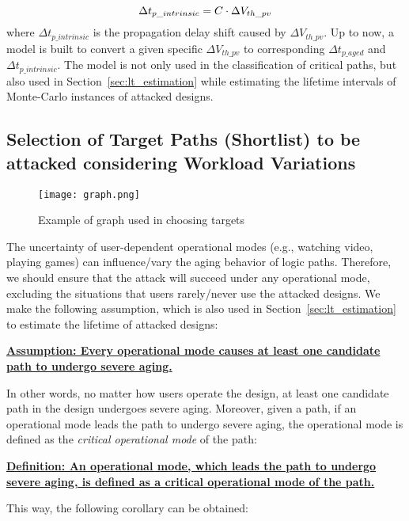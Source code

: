 \begin{equation}
	\centering
	\fontsize{9}{9} \selectfont
	\Delta t_{p\_intrinsic} = C \cdot \Delta V_{th\_pv}
	\label{eq:vtodelay2}
\end{equation}	
where $\Delta t_{p\_intrinsic}$ is the propagation delay shift caused by $\Delta V_{th\_pv}$. Up to now, a model is built to convert a given specific $\Delta V_{th\_pv}$ to corresponding $\Delta t_{p\_aged}$ and $\Delta t_{p\_intrinsic}$. The model is not only used in the classification of critical paths, but also used in Section~\ref{sec:lt_estimation} while estimating the lifetime intervals of Monte-Carlo instances of attacked designs. 
\subsection{Selection of Target Paths (Shortlist) to be attacked considering Workload Variations}
\label{sec:frame:workload}
\begin{figure}
	\centering
	\texttt{[image: graph.png]}
	\caption{Example of graph used in choosing targets}
	\label{fig:graph}
\end{figure}

The uncertainty of user-dependent operational modes (e.g., watching video, playing games) can influence/vary the aging behavior of logic paths. Therefore, we should ensure that the attack will succeed under any operational mode, excluding the situations that users rarely/never use the attacked designs. We make the following assumption, which is also used in Section~\ref{sec:lt_estimation} to estimate the lifetime of attacked designs:

\noindent \textbf{\uline{Assumption: Every operational mode causes at least one candidate path to undergo severe aging.}}

In other words, no matter how users operate the design, at least one candidate path in the design undergoes severe aging. Moreover, given a path, if an operational mode leads the path to undergo severe aging, the operational mode is defined as the \textit{critical operational mode} of the path:

\noindent \textbf{\uline{Definition: An operational mode, which leads the path to undergo severe aging, is defined as a critical operational mode of the path.}}

This way, the following corollary can be obtained:

